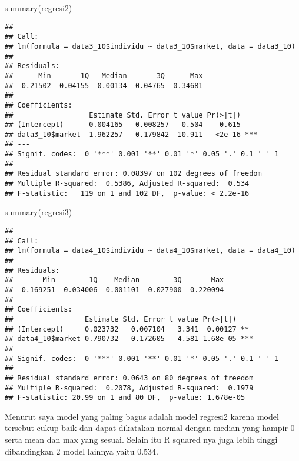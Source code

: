 \documentclass[
]{article}
\newenvironment{Shaded}{\begin{snugshade}}{\end{snugshade}}
\newcommand{\FunctionTok}[1]{\textcolor[rgb]{0.00,0.00,0.00}{#1}}
\newcommand{\NormalTok}[1]{#1}
\begin{document}
\begin{Shaded}
\begin{Highlighting}[]
\FunctionTok{summary}\NormalTok{(regresi2)}
\end{Highlighting}
\end{Shaded}

\begin{verbatim}
## 
## Call:
## lm(formula = data3_10$individu ~ data3_10$market, data = data3_10)
## 
## Residuals:
##      Min       1Q   Median       3Q      Max 
## -0.21502 -0.04155 -0.00134  0.04765  0.34681 
## 
## Coefficients:
##                  Estimate Std. Error t value Pr(>|t|)    
## (Intercept)     -0.004165   0.008257  -0.504    0.615    
## data3_10$market  1.962257   0.179842  10.911   <2e-16 ***
## ---
## Signif. codes:  0 '***' 0.001 '**' 0.01 '*' 0.05 '.' 0.1 ' ' 1
## 
## Residual standard error: 0.08397 on 102 degrees of freedom
## Multiple R-squared:  0.5386, Adjusted R-squared:  0.534 
## F-statistic:   119 on 1 and 102 DF,  p-value: < 2.2e-16
\end{verbatim}

\begin{Shaded}
\begin{Highlighting}[]
\FunctionTok{summary}\NormalTok{(regresi3)}
\end{Highlighting}
\end{Shaded}

\begin{verbatim}
## 
## Call:
## lm(formula = data4_10$individu ~ data4_10$market, data = data4_10)
## 
## Residuals:
##       Min        1Q    Median        3Q       Max 
## -0.169251 -0.034006 -0.001101  0.027900  0.220094 
## 
## Coefficients:
##                 Estimate Std. Error t value Pr(>|t|)    
## (Intercept)     0.023732   0.007104   3.341  0.00127 ** 
## data4_10$market 0.790732   0.172605   4.581 1.68e-05 ***
## ---
## Signif. codes:  0 '***' 0.001 '**' 0.01 '*' 0.05 '.' 0.1 ' ' 1
## 
## Residual standard error: 0.0643 on 80 degrees of freedom
## Multiple R-squared:  0.2078, Adjusted R-squared:  0.1979 
## F-statistic: 20.99 on 1 and 80 DF,  p-value: 1.678e-05
\end{verbatim}

Menurut saya model yang paling bagus adalah model regresi2 karena model
tersebut cukup baik dan dapat dikatakan normal dengan median yang hampir
0 serta mean dan max yang sesuai. Selain itu R squared nya juga lebih
tinggi dibandingkan 2 model lainnya yaitu 0.534.
\end{document}
